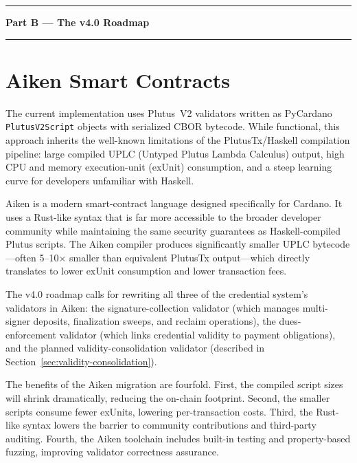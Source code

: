 
\vspace{1em}
\noindent\rule{\textwidth}{0.8pt}
\begin{center}
  {\Large\sffamily\bfseries Part B --- The v4.0 Roadmap}
\end{center}
\noindent\rule{\textwidth}{0.4pt}
\vspace{0.5em}


\section{Aiken Smart Contracts}
\label{sec:aiken}

The current implementation uses Plutus~V2 validators written as PyCardano
\texttt{PlutusV2Script} objects with serialized CBOR bytecode.  While
functional, this approach inherits the well-known limitations of the
PlutusTx/Haskell compilation pipeline: large compiled UPLC (Untyped Plutus
Lambda Calculus) output, high CPU and memory execution-unit (exUnit)
consumption, and a steep learning curve for developers unfamiliar with
Haskell.

Aiken is a modern smart-contract language designed specifically for Cardano.
It uses a Rust-like syntax that is far more accessible to the broader
developer community while maintaining the same security guarantees as
Haskell-compiled Plutus scripts.  The Aiken compiler produces significantly
smaller UPLC bytecode---often 5--10$\times$ smaller than equivalent PlutusTx
output---which directly translates to lower exUnit consumption and lower
transaction fees.

The v4.0 roadmap calls for rewriting all three of the credential system's
validators in Aiken: the signature-collection validator (which manages
multi-signer deposits, finalization sweeps, and reclaim operations), the
dues-enforcement validator (which links credential validity to payment
obligations), and the planned validity-consolidation validator (described in
Section~\ref{sec:validity-consolidation}).

The benefits of the Aiken migration are fourfold.  First, the compiled
script sizes will shrink dramatically, reducing the on-chain footprint.
Second, the smaller scripts consume fewer exUnits, lowering per-transaction
costs.  Third, the Rust-like syntax lowers the barrier to community
contributions and third-party auditing.  Fourth, the Aiken toolchain
includes built-in testing and property-based fuzzing, improving validator
correctness assurance.

